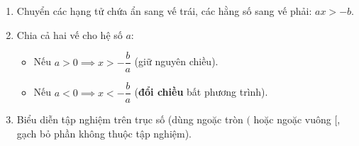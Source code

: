 \begin{enumerate}
\item Chuyển các hạng tử chứa ẩn sang vế trái, các hằng số sang vế phải: $ax > -b$.
\item Chia cả hai vế cho hệ số $a$:
\begin{itemize}
\item Nếu $a > 0 \implies \boxed{x > -\dfrac{b}{a}}$ (giữ nguyên chiều).
\item Nếu $a < 0 \implies \boxed{x < -\dfrac{b}{a}}$ (\textbf{đổi chiều} bất phương trình).
\end{itemize}
\item Biểu diễn tập nghiệm trên trục số (dùng ngoặc tròn $($ hoặc ngoặc vuông $[$, gạch bỏ phần không thuộc tập nghiệm).
\end{enumerate}

